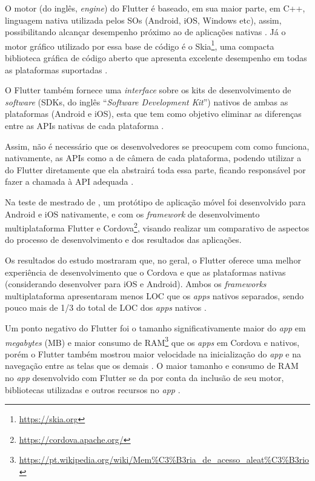O motor (do inglês, \emph{engine}) do Flutter é baseado, em sua maior parte, em C++, linguagem nativa utilizada pelos SOs (Android, iOS, Windows etc),
assim, possibilitando alcançar desempenho próximo ao de aplicações nativas \cite{zammetti2019practical,kuzmin2020experience}. Já o motor gráfico utilizado
por essa base de código é o Skia\footnote{\url{https://skia.org}}, uma compacta biblioteca gráfica de código aberto que apresenta excelente desempenho
em todas as plataformas suportadas \cite{zammetti2019practical,boukhary2019clean}.

O Flutter também fornece uma \emph{interface} sobre os kits de desenvolvimento de \emph{software} (SDKs, do inglês ``\emph{Software Development Kit}'')
nativos de ambas as plataformas (Android e iOS), esta que tem como objetivo eliminar as diferenças entre as APIs nativas de cada plataforma \cite{zammetti2019practical}.

Assim, não é necessário que os desenvolvedores se preocupem com como funciona, nativamente, as APIs como a de câmera de cada plataforma, podendo utilizar
a do Flutter diretamente que ela abstrairá toda essa parte, ficando responsável por fazer a chamada à API adequada \cite{zammetti2019practical}.

Na teste de mestrado de , um protótipo de aplicação móvel foi desenvolvido para Android e iOS nativamente, e com os
\emph{framework} de desenvolvimento multiplataforma Flutter e Cordova\footnote{\url{https://cordova.apache.org/}}, visando realizar um comparativo de
aspectos do processo de desenvolvimento e dos resultados das aplicações. 

Os resultados do estudo mostraram que, no geral, o Flutter oferece uma melhor experiência de desenvolvimento que o Cordova e que as plataformas nativas
(considerando desenvolver para iOS e Android). Ambos os \emph{frameworks} multiplataforma apresentaram menos LOC que os \emph{apps} nativos separados,
sendo pouco mais de 1/3 do total de LOC dos \emph{apps} nativos \cite{gonsalves2019evaluating}.

Um ponto negativo do Flutter foi o tamanho significativamente maior do \emph{app} em \emph{megabytes} (MB) e maior consumo de RAM\footnote{\url{https://pt.wikipedia.org/wiki/Mem\%C3\%B3ria_de_acesso_aleat\%C3\%B3rio}}
que os \emph{apps} em Cordova e nativos, porém o Flutter também mostrou maior velocidade na inicialização do \emph{app} e na navegação entre as telas
que os demais \cite{gonsalves2019evaluating}. O maior tamanho e consumo de RAM no \emph{app} desenvolvido com Flutter se da por conta da inclusão de seu
motor, bibliotecas utilizadas e outros recursos no \emph{app} \cite{gonsalves2019evaluating,zammetti2019practical}.

